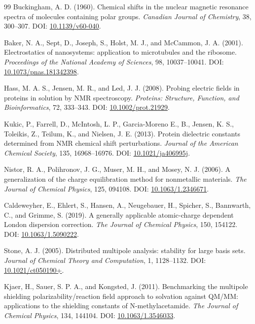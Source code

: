 \documentclass[11pt]{article}
\begin{document}
\begin{thebibliography}{99}
Buckingham, A. D. (1960).
Chemical shifts in the nuclear magnetic resonance spectra of molecules
containing polar groups.
\emph{Canadian Journal of Chemistry}, 38, 300--307.
DOI: \href{https://doi.org/10.1139/v60-040}{10.1139/v60-040}.

Baker, N. A., Sept, D., Joseph, S., Holst, M. J., and McCammon, J. A. (2001).
Electrostatics of nanosystems: application to microtubules and the ribosome.
\emph{Proceedings of the National Academy of Sciences}, 98, 10037--10041.
DOI: \href{https://doi.org/10.1073/pnas.181342398}{10.1073/pnas.181342398}.

Hass, M. A. S., Jensen, M. R., and Led, J. J. (2008).
Probing electric fields in proteins in solution by NMR spectroscopy.
\emph{Proteins: Structure, Function, and Bioinformatics}, 72, 333--343.
DOI: \href{https://doi.org/10.1002/prot.21929}{10.1002/prot.21929}.

Kukic, P., Farrell, D., McIntosh, L. P., Garcia-Moreno E., B.,
Jensen, K. S., Toleikis, Z., Teilum, K., and Nielsen, J. E. (2013).
Protein dielectric constants determined from NMR chemical shift perturbations.
\emph{Journal of the American Chemical Society}, 135, 16968--16976.
DOI: \href{https://doi.org/10.1021/ja406995j}{10.1021/ja406995j}.

Nistor, R. A., Polihronov, J. G., Muser, M. H., and Mosey, N. J. (2006).
A generalization of the charge equilibration method for nonmetallic materials.
\emph{The Journal of Chemical Physics}, 125, 094108.
DOI: \href{https://doi.org/10.1063/1.2346671}{10.1063/1.2346671}.

Caldeweyher, E., Ehlert, S., Hansen, A., Neugebauer, H., Spicher, S.,
Bannwarth, C., and Grimme, S. (2019).
A generally applicable atomic-charge dependent London dispersion correction.
\emph{The Journal of Chemical Physics}, 150, 154122.
DOI: \href{https://doi.org/10.1063/1.5090222}{10.1063/1.5090222}.

Stone, A. J. (2005).
Distributed multipole analysis: stability for large basis sets.
\emph{Journal of Chemical Theory and Computation}, 1, 1128--1132.
DOI: \href{https://doi.org/10.1021/ct050190+}{10.1021/ct050190+}.

Kjaer, H., Sauer, S. P. A., and Kongsted, J. (2011).
Benchmarking the multipole shielding polarizability/reaction field approach
to solvation against QM/MM: applications to the shielding constants of
N-methylacetamide.
\emph{The Journal of Chemical Physics}, 134, 144104.
DOI: \href{https://doi.org/10.1063/1.3546033}{10.1063/1.3546033}.


\end{thebibliography}
\end{document}
